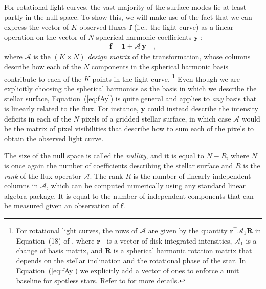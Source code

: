 \documentclass[modern]{aastex62}
\begin{document}
For rotational light curves,
the vast majority of the surface modes lie at least partly in the null
space. To show this, we will make use of the fact that we can express
the vector of $K$ observed fluxes $\mathbf{f}$ (i.e., the light curve)
as a linear operation on the vector of $N$
spherical harmonic coefficients $\mathbf{y}$ \citep{Luger2019}:
%
\begin{align}
    \label{eq:fAy}
    \mathbf{f} = \mathbf{1} + \pmb{\mathcal{A}} \, \mathbf{y}
    \quad,
\end{align}
%
where $\pmb{\mathcal{A}}$ is the $(K \times N)$ \emph{design matrix} of the transformation, whose columns
describe how each of the $N$ components in the spherical harmonic basis contribute
to each of the $K$ points in the light curve.%
\footnote{%
    For rotational light curves, the rows of $\pmb{\mathcal{A}}$ are given by the
    quantity $\mathbf{r}^\top \pmb{\mathcal{A}}_1 \mathbf{R}$ in Equation~(18) of
    \citet{Luger2019}, where $\mathbf{r}^\top$ is a vector of disk-integrated
    intensities, $\pmb{\mathcal{A}}_1$ is a change of basis matrix, and $\mathbf{R}$
    is a spherical harmonic rotation matrix that depends on the stellar inclination
    and the rotational phase of the star. In Equation~(\ref{eq:fAy}) we explicitly
    add a vector of ones to enforce a unit baseline for spotless stars.
    Refer to \citet{Luger2019} for more details.
}
%
Even though we are explicitly choosing the spherical harmonics as the basis in which
we describe the stellar surface, Equation~(\ref{eq:fAy}) is quite general and applies to
\emph{any} basis that is linearly related to the flux. For instance, $\mathbf{y}$
could instead describe the intensity deficits in each of the $N$ pixels of a gridded stellar
surface, in which case $\pmb{\mathcal{A}}$ would be the matrix of pixel visibilities that describe
how to sum each of the pixels to obtain the observed light curve.

The size of the null space is called the \emph{nullity}, and it is equal to
$N - R$, where $N$ is once again the number of coefficients describing the
stellar surface and $R$ is the \emph{rank} of the flux operator $\pmb{\mathcal{A}}$.
The rank $R$ is the number of linearly independent columns in $\pmb{\mathcal{A}}$, which
can be computed numerically using any standard linear algebra package. It is equal
to the number of independent components that can be measured given
an observation of $\mathbf{f}$.
\end{document}
